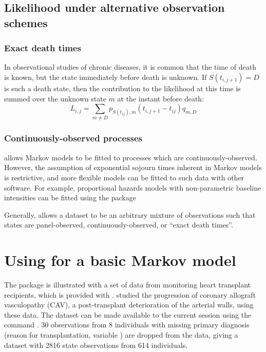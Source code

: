 \documentclass[article,shortnames]{jss}
\begin{document}
\subsection{Likelihood under alternative observation schemes}
\label{sec:altobs}

\subsubsection{Exact death times}
\label{sec:exactdeath}
In observational studies of chronic diseases, it is common that the
time of death is known, but the state immediately before death is
unknown. If $S(t_{i,j+1}) = D$ is such a death state, then the
contribution to the likelihood at this time is summed over the unknown
state $m$ at the instant before death:
\[
  L_{i, j} =  \sum_{m \neq D} p_{S(t_{ij}),m}(t_{i,j+1} - t_{ij}) q_{m, D}
\]

\subsubsection{Continuously-observed processes}
 allows Markov models to be fitted to processes which are
continuously-observed.  However, the assumption of exponential sojourn
times inherent in Markov models is restrictive, and more flexible
models can be fitted to such data with other software. For example,
proportional hazards models with non-parametric baseline intensities
can be fitted using the  package \citep{i07,mstate:jss}

Generally,  allows a dataset to be an arbitrary mixture of
observations such that states are panel-observed,
continuously-observed, or ``exact death times''.


\section[Using msm for a basic Markov model]{Using  for a basic Markov model}
\label{sec:basic}

The package is illustrated with a set of data from monitoring heart
transplant recipients, which is provided with .
\citet{my:cav} studied the progression of coronary allograft
vasculopathy (CAV), a post-transplant deterioration of the arterial
walls, using these data.  The dataset can be made available to the
current  session using the command .  30
observations from 8 individuals with missing primary diagnosis (reason
for transplantation, variable ) are dropped from the data,
giving a dataset with 2816 state observations from 614 individuals.
\end{document}
